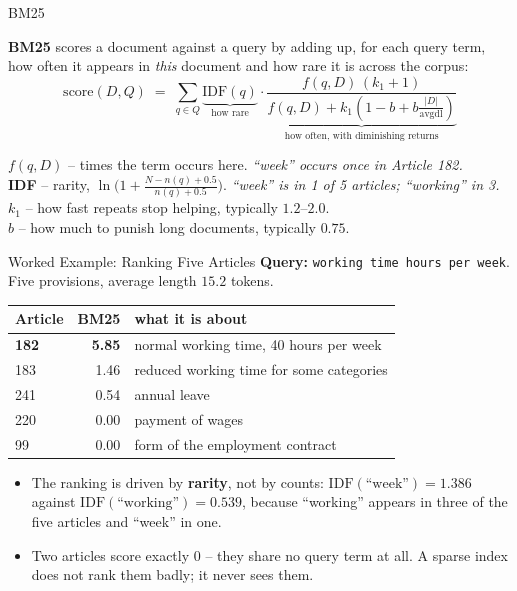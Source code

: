 \begin{frame}{BM25}
\begin{rldefinition}
\textbf{BM25} scores a document against a query by adding up, for each query term, how often it appears in \emph{this} document and how rare it is across the corpus:
\vspace{-0.3em}
\[
  \mathrm{score}(D,Q) \;=\; \sum_{q \in Q} \underbrace{\mathrm{IDF}(q)}_{\text{how rare}}
  \cdot \underbrace{\frac{f(q,D)\,(k_1+1)}{f(q,D) + k_1\!\left(1 - b + b\frac{|D|}{\mathrm{avgdl}}\right)}}_{\text{how often, with diminishing returns}}
\]
\vspace{-0.6em}

\textbf{$f(q,D)$} -- times the term occurs here. \emph{``week'' occurs once in Article 182.}\\
\textbf{IDF} -- rarity, $\ln\!\big(1 + \frac{N - n(q) + 0.5}{n(q)+0.5}\big)$. \emph{``week'' is in 1 of 5 articles; ``working'' in 3.}\\
\textbf{$k_1$} -- how fast repeats stop helping, typically $1.2$--$2.0$.\\
\textbf{$b$} -- how much to punish long documents, typically $0.75$.
\end{rldefinition}
\end{frame}

\begin{frame}{Worked Example: Ranking Five Articles}
\small
\textbf{Query:} \texttt{working time hours per week}. Five provisions, average length $15.2$ tokens.
\smallskip
\pause

\centering
\begin{tabular}{l|r|l}
Article & BM25 & what it is about \\
\hline
\textbf{182} & \textbf{5.85} & normal working time, 40 hours per week \\
183          & 1.46          & reduced working time for some categories \\
241          & 0.54          & annual leave \\
220          & 0.00          & payment of wages \\
99           & 0.00          & form of the employment contract \\
\end{tabular}

\vspace{0.6em}
\raggedright
\pause
\begin{itemize}
  \item The ranking is driven by \textbf{rarity}, not by counts: $\mathrm{IDF}(\text{``week''}) = 1.386$ against $\mathrm{IDF}(\text{``working''}) = 0.539$, because ``working'' appears in three of the five articles and ``week'' in one.
  \pause
  \item Two articles score exactly $0$ -- they share no query term at all. A sparse index does not rank them badly; it never sees them.
\end{itemize}
\end{frame}

